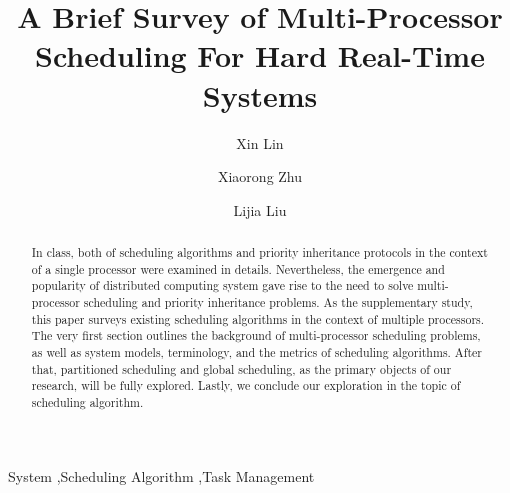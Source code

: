 \documentclass[preprint,12pt]{elsarticle}
\begin{document}
\begin{frontmatter}



\title{A Brief Survey of Multi-Processor Scheduling For Hard Real-Time Systems}


\author[UTCS]{Xin Lin}
\author[UTCS]{Xiaorong Zhu}
\author[UTCS]{Lijia Liu}

\address[UTCS]{Department of Computer Science, The University of Texas at Austin}

\begin{abstract}
In class, both of scheduling algorithms \cite{liu1973scheduling} and priority
inheritance protocols \cite{sha1990priority} in
the context of a single processor were examined in details.  Nevertheless, the
emergence and popularity of distributed computing system gave rise to the
need to solve multi-processor scheduling and priority inheritance problems. 
As the supplementary study, this paper surveys existing scheduling algorithms in
the context of multiple processors. The very first section outlines the
background of multi-processor scheduling problems, as well as system models,
terminology, and the metrics of scheduling algorithms. After that, partitioned
scheduling and global scheduling, as the primary objects of our research, will
be fully explored. Lastly, we conclude our exploration in the topic of
scheduling algorithm.  
\end{abstract}

\begin{keyword}
System \sep Scheduling Algorithm \sep Task Management


\end{keyword}

\end{frontmatter}
\end{document}
